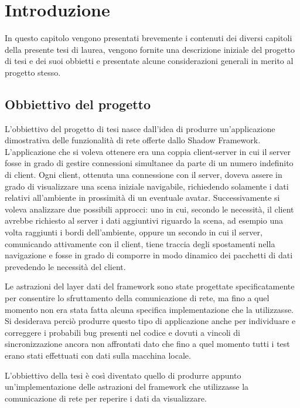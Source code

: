
\chapter{Introduzione}
\label{ch:introduzione}
In questo capitolo vengono presentati brevemente i contenuti dei diversi capitoli della presente tesi di laurea, vengono fornite una descrizione iniziale del progetto di tesi e dei suoi obbietti e presentate alcune considerazioni generali in merito al progetto stesso.

%
%
\section{Obbiettivo del progetto}
\label{sec:obbiettivo}
L'obbiettivo del progetto di tesi nasce dall'idea di produrre un'applicazione dimostrativa delle funzionalità di rete offerte dallo Shadow Framework.
L'applicazione che si voleva ottenere era una coppia client-server in cui il server fosse in grado di gestire connessioni simultanee da parte di un numero indefinito di client. 
Ogni client, ottenuta una connessione con il server, doveva assere in grado di visualizzare una scena iniziale navigabile, richiedendo solamente i dati relativi all'ambiente in prossimità di un eventuale avatar.
Successivamente si voleva analizzare due possibili approcci: uno in cui, secondo le necessità, il client avrebbe richiesto al server i dati aggiuntivi riguardo la scena, ad esempio una volta raggiunti i bordi dell'ambiente, oppure un secondo in cui il server, comunicando attivamente con il client, tiene traccia degli spostamenti nella navigazione e fosse in grado di comporre in modo dinamico dei pacchetti di dati prevedendo le necessità del client.

Le astrazioni del layer dati del framework sono state progettate specificatamente per consentire lo sfruttamento della comunicazione di rete, ma fino a quel momento non era stata fatta alcuna specifica implementazione che la utilizzasse. Si desiderava perciò produrre questo tipo di applicazione anche per individuare e correggere i probabili bug presenti nel codice e dovuti a vincoli di sincronizzazione ancora non affrontati dato che fino a quel momento tutti i test erano stati effettuati con dati sulla macchina locale.

L'obbiettivo della tesi è così diventato quello di produrre appunto un'implementazione delle astrazioni del framework che utilizzasse la comunicazione di rete per reperire i dati da visualizzare.